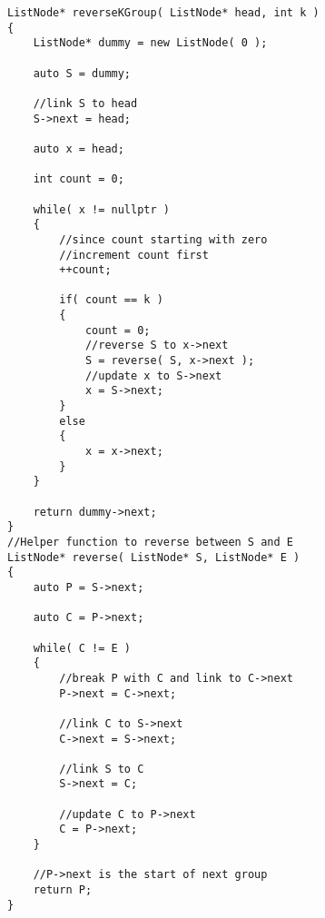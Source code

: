 \setcounter{lstlisting}{0}
\begin{lstlisting}[style=customc, caption={Pointer operation}]
ListNode* reverseKGroup( ListNode* head, int k )
{
    ListNode* dummy = new ListNode( 0 );

    auto S = dummy;

    //link S to head
    S->next = head;

    auto x = head;

    int count = 0;

    while( x != nullptr )
    {
        //since count starting with zero
        //increment count first
        ++count;

        if( count == k )
        {
            count = 0;
            //reverse S to x->next
            S = reverse( S, x->next );
            //update x to S->next
            x = S->next;
        }
        else
        {
            x = x->next;
        }
    }

    return dummy->next;
}
//Helper function to reverse between S and E
ListNode* reverse( ListNode* S, ListNode* E )
{
    auto P = S->next;

    auto C = P->next;

    while( C != E )
    {
        //break P with C and link to C->next
        P->next = C->next;

        //link C to S->next
        C->next = S->next;

        //link S to C
        S->next = C;

        //update C to P->next
        C = P->next;
    }

    //P->next is the start of next group
    return P;
}
\end{lstlisting}
